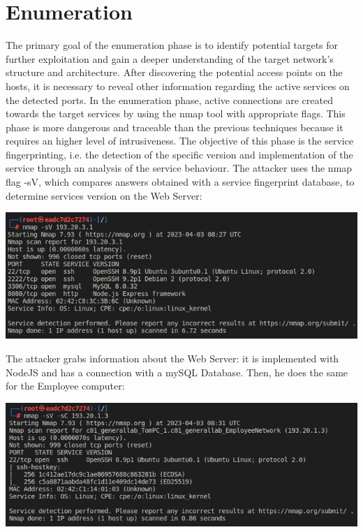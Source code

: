 \documentclass[a4paper, 12pt, oneside]{extbook}
\begin{document}
\chapter{Enumeration}
The primary goal of the enumeration phase is to identify potential targets for further exploitation and gain a deeper understanding of the target network's structure and architecture.
After discovering the potential access points on the hosts, it is necessary to reveal other information regarding the active services on the detected ports. In the enumeration phase,
active connections are created towards the target services by using the nmap tool with appropriate flags. This phase is more dangerous and traceable than the previous techniques because it requires an higher level of intrusiveness.
\newline The objective of this phase is the service fingerprinting, i.e. the detection of the specific version and implementation of the service through an analysis of the service behaviour. 
\newline The attacker uses the nmap flag -sV, which compares answers obtained with a service fingerprint database, to determine services version on the Web Server:
\begin{center}
\includegraphics[scale=0.76]{../Image/enumeration_company_sv.PNG}
\end{center}
The attacker grabs information about the Web Server: it is implemented with NodeJS and has a connection with a mySQL Database. Then, he does the same for the Employee computer:
\begin{center}
\includegraphics[scale=0.76]{../Image/enumeration_tom_sv.PNG}
\end{center}
\end{document}
